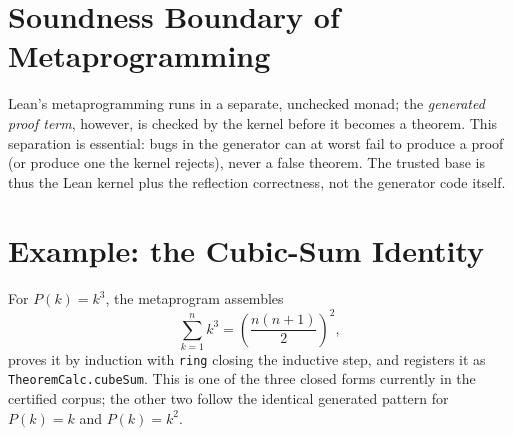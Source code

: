 \section{Soundness Boundary of Metaprogramming}
\label{sec:meta-sound}

Lean's metaprogramming runs in a separate, unchecked monad; the
\emph{generated proof term}, however, is checked by the kernel before it
becomes a theorem. This separation is essential: bugs in the generator can
at worst fail to produce a proof (or produce one the kernel rejects), never
a false theorem. The trusted base is thus the Lean kernel plus the
reflection correctness, not the generator code itself.

\section{Example: the Cubic-Sum Identity}
\label{sec:meta-example}

For $P(k)=k^3$, the metaprogram assembles
\[
\sum_{k=1}^{n} k^3 = \left(\frac{n(n+1)}{2}\right)^2,
\]
proves it by induction with \texttt{ring} closing the inductive step, and
registers it as \texttt{TheoremCalc.cubeSum}. This is one of the three
closed forms currently in the certified corpus; the other two follow the
identical generated pattern for $P(k)=k$ and $P(k)=k^2$.
